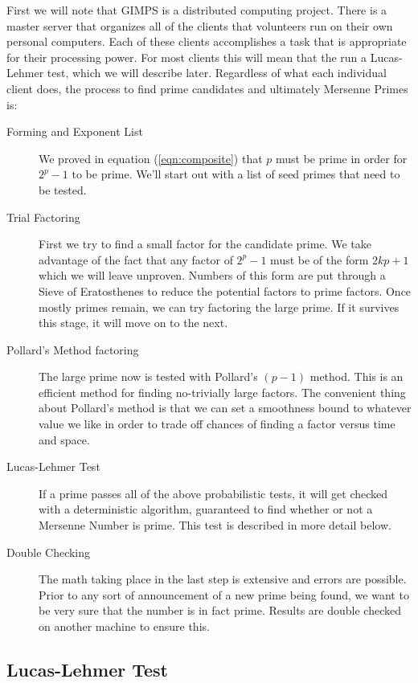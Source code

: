 First we will note that GIMPS is a distributed computing project.  There is a master server that organizes all of the clients that volunteers run on their own personal computers.  Each of these clients accomplishes a task that is appropriate for their processing power.  For most clients this will mean that the run a Lucas-Lehmer test, which we will describe later.  Regardless of what each individual client does, the process to find prime candidates and ultimately Mersenne Primes is:
\begin{description}
\item[Forming and Exponent List]  We proved in equation (\ref{eqn:composite}) that $p$ must be prime in order for $2^p - 1$ to be prime.  We'll start out with a list of seed primes that need to be tested.
\item[Trial Factoring] First we try to find a small factor for the candidate prime.  We take advantage of the fact that any factor of $2^p - 1$ must be of the form $2kp +1$ which we will leave unproven.  Numbers of this form are put through a Sieve of Eratosthenes to reduce the potential factors to prime factors.  Once mostly primes remain, we can try factoring the large prime. If it survives this stage, it will move on to the next.
\item[Pollard's Method factoring] The large prime now is tested with Pollard's $(p - 1)$ method.  This is an efficient method for finding no-trivially large factors.  The convenient thing about Pollard's method is that we can set a smoothness bound to whatever value we like in order to trade off chances of finding a factor versus time and space.
\item[Lucas-Lehmer Test] If a prime passes all of the above probabilistic tests, it will get checked with a deterministic algorithm, guaranteed to find whether or not a Mersenne Number is prime.  This test is described in more detail below.
\item[Double Checking] The math taking place in the last step is extensive and errors are possible.  Prior to any sort of announcement of a new prime being found, we want to be very sure that the number is in fact prime.  Results are double checked on another machine to ensure this.
\end{description}

\subsection{Lucas-Lehmer Test}
\label{sec:llt}

